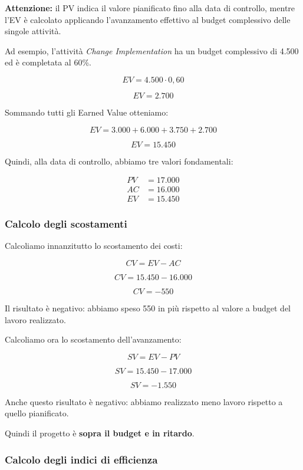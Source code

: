 \noindent \textbf{Attenzione:} il PV indica
il valore pianificato fino alla data di controllo,
mentre l'EV è calcolato applicando
l'avanzamento effettivo al budget
complessivo delle singole attività.

\medskip

\noindent Ad esempio, l'attività
\textit{Change Implementation}
ha un budget complessivo di 4.500
ed è completata al 60\%.

\[
EV=4.500\cdot0{,}60
\]

\[
\boxed{EV=2.700}
\]

\noindent Sommando tutti gli Earned Value
otteniamo:

\[
EV=3.000+6.000+3.750+2.700
\]

\[
\boxed{EV=15.450}
\]

\noindent Quindi, alla data di controllo,
abbiamo tre valori fondamentali:

\[
\boxed{
\begin{aligned}
PV&=17.000\\
AC&=16.000\\
EV&=15.450
\end{aligned}
}
\]


\subsubsection*{Calcolo degli scostamenti}

\noindent Calcoliamo innanzitutto
lo scostamento dei costi:

\[
CV=EV-AC
\]

\[
CV=15.450-16.000
\]

\[
\boxed{CV=-550}
\]

\noindent Il risultato è negativo:
abbiamo speso 550 in più rispetto
al valore a budget del lavoro realizzato.

\medskip

\noindent Calcoliamo ora
lo scostamento dell'avanzamento:

\[
SV=EV-PV
\]

\[
SV=15.450-17.000
\]

\[
\boxed{SV=-1.550}
\]

\noindent Anche questo risultato è negativo:
abbiamo realizzato meno lavoro
rispetto a quello pianificato.

\medskip

\noindent Quindi il progetto è
\textbf{sopra il budget e in ritardo}.


\subsubsection*{Calcolo degli indici di efficienza}

